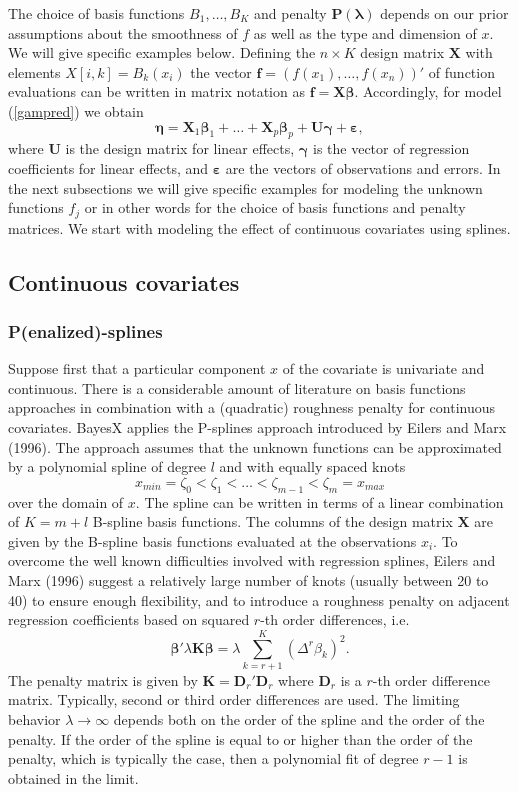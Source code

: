 \documentclass[11pt,a4paper,twoside]{bayesxarticle}
\def \Kvec {\vec{K}}
\def \Pvec {\vec{P}}
\def \lambdavec {\boldsymbol{\lambda}}
\def \betavec {\boldsymbol{\beta}}
\def \etavec {\boldsymbol{\eta}}
\def \gammavec {\boldsymbol{\gamma}}
\def \varepsilonvec {\boldsymbol{\varepsilon}}
\def \fvec {\mathbf{f}}
\def \Dvec {\mathbf{D}}
\def \Kvec {\mathbf{K}}
\def \Uvec {\mathbf{U}}
\def \Pvec {\mathbf{P}}
\def \Xvec {\mathbf{X}}
\begin{document}
The choice of basis functions $B_1,\dots,B_K$ and penalty  $\Pvec(\lambdavec)$ depends on our prior assumptions about the smoothness
of $f$ as well as
the type and dimension of $x$. We will give specific examples below. Defining the $n \times K$ design matrix $\Xvec$ with elements
$X[i,k] = B_k(x_i)$ the
vector $\fvec = (f(x_1),\dots,f(x_n))'$ of function evaluations can be written in matrix notation as $\fvec = \Xvec \betavec$.
Accordingly,  for model (\ref{gampred}) we obtain
$$
\etavec = \Xvec_1 \betavec_1 + \ldots + \Xvec_p \betavec_p + \Uvec \gammavec +  \varepsilonvec,
$$
where $\Uvec$ is the design matrix for linear effects, $\gammavec$ is the vector of regression coefficients for linear effects, and
$\varepsilonvec$
are the vectors of observations and errors.
In the next subsections we will give specific examples for modeling the unknown functions $f_j$ or in other words for the choice of basis functions and
penalty matrices.
We start with modeling the effect of continuous covariates using splines.

\subsection{Continuous covariates}
\subsubsection{P(enalized)-splines}
Suppose first that a particular component $x$ of the covariate  is univariate and continuous. There is a considerable
amount of literature on basis functions approaches
in combination with a (quadratic) roughness penalty for continuous covariates.
BayesX applies the P-splines approach introduced by Eilers and Marx (1996).
The approach assumes that the unknown functions can be approximated
by a polynomial spline of degree $l$
and with equally spaced knots
$$
x_{min} = \zeta_{0}  < \zeta_{1} < \dots < \zeta_{m-1} < \zeta_{m} = x_{max}
$$
over the domain of
$x$.
The spline can be written in terms of a linear combination of $K=m+l$
B-spline basis functions.
The columns of the design matrix $\Xvec$ are given by the B-spline basis functions
evaluated at the observations $x_i$. To overcome the well known difficulties involved with regression
splines, Eilers and Marx (1996)  suggest a relatively large
number of knots (usually between 20 to 40) to ensure enough
flexibility, and to introduce a roughness
penalty on adjacent regression coefficients based on
squared $r$-th order differences, i.e.
$$
\betavec' \lambda \Kvec \betavec = \lambda \sum_{k=r+1}^K (\Delta^r \beta_k)^2.
$$
The penalty matrix is given by $\Kvec =  \Dvec_r' \Dvec_r$ where $\Dvec_r$ is a $r$-th order difference matrix.
Typically, second or third order differences are used. The limiting behavior $\lambda \rightarrow \infty$ depends both on the
order of the spline
and the order of the penalty. If the order of the spline is equal to or
higher than the order of  the penalty, which is typically the case, then a polynomial
fit of degree $r-1$ is obtained in the limit.
\end{document}
